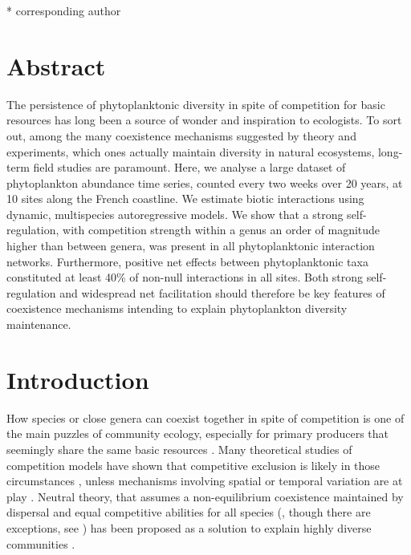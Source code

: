 \documentclass[10pt]{article}
\begin{document}
\bigskip
\vspace{200pt}
* corresponding author

\newpage
{}

\section*{Abstract}
The persistence of phytoplanktonic diversity in spite of competition for basic resources has long been a source of wonder and inspiration to ecologists. To sort out, among the many coexistence mechanisms suggested by theory and experiments, which ones actually maintain diversity in natural ecosystems, long-term field studies are paramount. Here, we analyse a large dataset of phytoplankton abundance time series, counted every two weeks over 20 years, at 10 sites along the French coastline. We estimate biotic interactions using dynamic, multispecies autoregressive models. We show that a strong self-regulation, with competition strength within a genus an order of magnitude higher than between genera, was present in all phytoplanktonic interaction networks. Furthermore, positive net effects between phytoplanktonic taxa constituted at least 40\% of non-null interactions in all sites. Both strong self-regulation and widespread net facilitation should therefore be key features of coexistence mechanisms intending to explain phytoplankton diversity maintenance.

\linenumbers

\doublespacing
\newpage
\section*{Introduction}
How species or close genera can coexist together in spite of competition
is one of the main puzzles of community ecology, especially for primary
producers that seemingly share the same basic resources \citep{hutchinson_paradox_1961}.
Many theoretical studies of competition models have shown that competitive
exclusion is likely in those circumstances \citep{armstrong1980competitive,chesson_updates_2018},
unless mechanisms involving spatial or temporal variation are at play \citep{armstrong1976coexistence,chesson_roles_1997,huisman_biological_2001,li_effects_2016}.
Neutral theory, that assumes a non-equilibrium coexistence maintained
by dispersal and equal competitive abilities for all species
(\citealt{hubbell_unified_2001}, though there are exceptions, see \citealt{volkov_neutral_2003,volkov_patterns_2007})
has been proposed as a solution to explain highly diverse communities \citep{hubbell_unified_2001,rosindell2011unified}.
\end{document}
